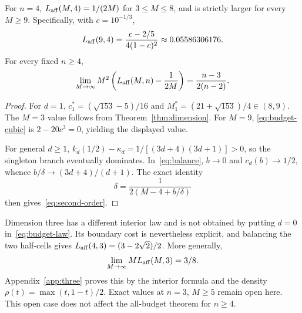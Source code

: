 \begin{corollary}\label{cor:transition}
For $n=4$, $L_{\mathrm{aff}}(M,4)=1/(2M)$ for $3\le M\le8$, and is strictly larger for every $M\ge9$. Specifically, with $c=10^{-1/3}$,
\[
L_{\mathrm{aff}}(9,4)=\frac{c-2/5}{4(1-c)^2}\approx0.05586306176.
\]
For every fixed $n\ge4$,
\begin{equation}\label{eq:second-order}
\lim_{M\to\infty}M^2\left(L_{\mathrm{aff}}(M,n)-\frac1{2M}\right)
=\frac{n-3}{2(n-2)}.
\end{equation}
\end{corollary}
\begin{proof}
For $d=1$, $c_1^*=(\sqrt{153}-5)/16$ and $M_1^*=(21+\sqrt{153})/4\in(8,9)$. The $M=3$ value follows from Theorem~\ref{thm:dimension}. For $M=9$, \eqref{eq:budget-cubic} is $2-20c^3=0$, yielding the displayed value.

For general $d\ge1$,
$k_d(1/2)-\kappa_d=1/[(3d+4)(3d+1)]>0$,
so the singleton branch eventually dominates. In~\eqref{eq:balance}, $b\to0$ and $c_d(b)\to1/2$, whence $b/\delta\to(3d+4)/(d+1)$. The exact identity
\[
\delta=\frac1{2(M-4+b/\delta)}
\]
then gives~\eqref{eq:second-order}.
\end{proof}

Dimension three has a different interior law and is not obtained by putting $d=0$ in~\eqref{eq:budget-law}. Its boundary cost is nevertheless explicit, and balancing the two half-cells gives
$L_{\mathrm{aff}}(4,3)=(3-2\sqrt2)/2$. More generally,
\begin{equation}\label{eq:three-asymptotic}
\lim_{M\to\infty}ML_{\mathrm{aff}}(M,3)=3/8.
\end{equation}
Appendix~\ref{app:three} proves this by the interior formula and the density $\rho(t)=\max(t,1-t)/2$. Exact values at $n=3$, $M\ge5$ remain open here. This open case does not affect the all-budget theorem for $n\ge4$.
